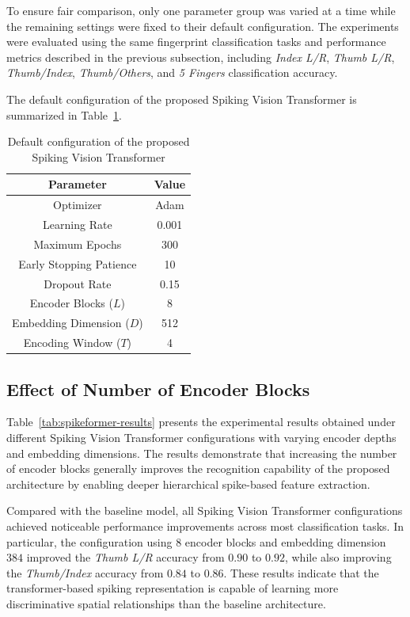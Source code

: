 \documentclass[../main.tex]{subfiles}
\begin{document}
To ensure fair comparison, only one parameter group was varied at a time while the remaining settings were fixed to their default configuration. The experiments were evaluated using the same fingerprint classification tasks and performance metrics described in the previous subsection, including \textit{Index L/R}, \textit{Thumb L/R}, \textit{Thumb/Index}, \textit{Thumb/Others}, and \textit{5 Fingers} classification accuracy.

The default configuration of the proposed Spiking Vision Transformer is summarized in Table~\ref{tab:spikformer_default_config}.

\begin{table}[h]
\centering
\caption{Default configuration of the proposed Spiking Vision Transformer}
\label{tab:spikformer_default_config}
\begin{tabular}{|c|c|}
\hline
\textbf{Parameter} & \textbf{Value} \\ \hline
Optimizer & Adam \\ \hline
Learning Rate & 0.001 \\ \hline
Maximum Epochs & 300 \\ \hline
Early Stopping Patience & 10 \\ \hline
Dropout Rate & 0.15 \\ \hline
Encoder Blocks (\(L\)) & 8 \\ \hline
Embedding Dimension (\(D\)) & 512 \\ \hline
Encoding Window (\(T\)) & 4 \\ \hline
\end{tabular}
\end{table}

\subsection{Effect of Number of Encoder Blocks}

Table~\ref{tab:spikeformer-results} presents the experimental results obtained under different Spiking Vision Transformer configurations with varying encoder depths and embedding dimensions. The results demonstrate that increasing the number of encoder blocks generally improves the recognition capability of the proposed architecture by enabling deeper hierarchical spike-based feature extraction.

Compared with the baseline model, all Spiking Vision Transformer configurations achieved noticeable performance improvements across most classification tasks. In particular, the configuration using \(8\) encoder blocks and embedding dimension \(384\) improved the \textit{Thumb L/R} accuracy from \(0.90\) to \(0.92\), while also improving the \textit{Thumb/Index} accuracy from \(0.84\) to \(0.86\). These results indicate that the transformer-based spiking representation is capable of learning more discriminative spatial relationships than the baseline architecture.
\end{document}
